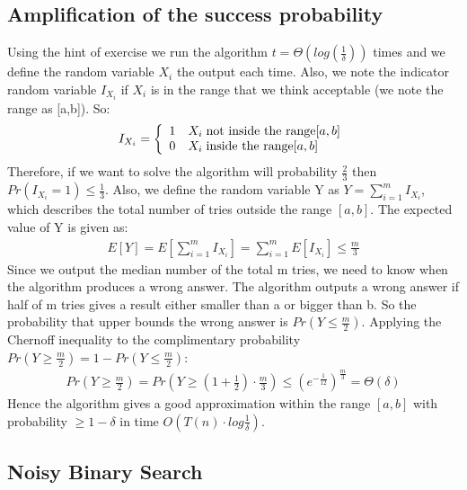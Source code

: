 \documentclass[11pt]{537homework}
\begin{document}
\subsection{Amplification of the success probability}
Using the hint of exercise we run the algorithm $t = \Theta(log(\frac{1}{\delta}))$ times and we define the random variable $X_i$ the output each time. Also, we note the indicator random variable $I_{X_i}$ if $X_i$ is in the range that we think acceptable (we note the range as [a,b]). So:
\[ 
I_{X_i}= \left\{
\begin{array}{ll}
      1 & X_i \hspace{0.1cm}\text{not inside the range} [a,b] \\
      0 & X_i \hspace{0.1cm}\text{inside the range} [a,b]
\end{array} 
\right. 
\]
Therefore, if we want to solve the algorithm will probability $\frac{2}{3}$ then $Pr(I_{X_i} =1) \leq \frac{1}{3}$. Also, we define the random variable Y as $Y = \sum_{i= 1}^{m} I_{X_i}$, which describes the total number of tries outside the range $[a,b]$. The expected value of Y is given as:
\begin{align*}
E[Y] = E[\sum_{i= 1}^{m} I_{X_i}] = \sum_{i= 1}^{m} E[I_{X_i}] \leq \frac{m}{3}
\end{align*}
Since we output the median number of the total m tries, we need to know when the algorithm produces a wrong answer. The algorithm outputs a wrong answer if half of m tries gives a result either smaller than a or bigger than b. So the probability that upper bounds the wrong answer is $Pr(Y \leq \frac{m}{2})$. Applying the Chernoff inequality to the complimentary probability $Pr(Y \geq \frac{m}{2}) = 1 - Pr(Y \leq \frac{m}{2})$:
\begin{align*}
Pr(Y \geq \frac{m}{2}) = Pr(Y \geq (1+\frac{1}{2}) \cdot \frac{m}{3}) \leq (e^{-\frac{1}{12}})^{\frac{m}{3}} = \Theta(\delta)
\end{align*}
Hence the algorithm gives a good approximation within the range $[a,b]$ with probability $ \geq 1 - \delta$ in time $O(T(n)\cdot log\frac{1}{\delta})$.



\subsection{Noisy Binary Search}
\end{document}
